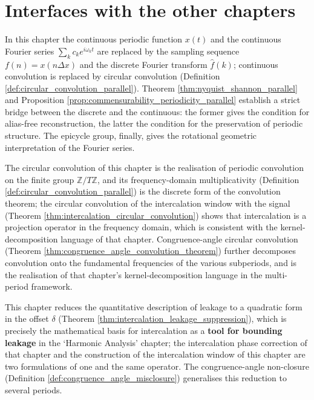 \section{Interfaces with the other chapters}\label{sec:ch17_interfaces}

\begin{remark}\label{rem:interface_periodic_function_parallel}
In this chapter the continuous periodic function $x(t)$ and the continuous Fourier series $\sum_kc_ke^{i\omega_kt}$ are replaced by the sampling sequence $f(n)=x(n\Delta x)$ and the discrete Fourier transform $\hat f(k)$; continuous convolution is replaced by circular convolution (Definition \ref{def:circular_convolution_parallel}). Theorem \ref{thm:nyquist_shannon_parallel} and Proposition \ref{prop:commensurability_periodicity_parallel} establish a strict bridge between the discrete and the continuous: the former gives the condition for alias-free reconstruction, the latter the condition for the preservation of periodic structure. The epicycle group, finally, gives the rotational geometric interpretation of the Fourier series.
\end{remark}

\begin{remark}\label{rem:interface_series_convolution_parallel}
The circular convolution of this chapter is the realisation of periodic convolution on the finite group $\mathbb{Z}/T\mathbb{Z}$, and its frequency-domain multiplicativity (Definition \ref{def:circular_convolution_parallel}) is the discrete form of the convolution theorem; the circular convolution of the intercalation window with the signal (Theorem \ref{thm:intercalation_circular_convolution}) shows that intercalation is a projection operator in the frequency domain, which is consistent with the kernel-decomposition language of that chapter. Congruence-angle circular convolution (Theorem \ref{thm:congruence_angle_convolution_theorem}) further decomposes convolution onto the fundamental frequencies of the various subperiods, and is the realisation of that chapter's kernel-decomposition language in the multi-period framework.
\end{remark}

\begin{remark}\label{rem:interface_harmonic_analysis_parallel}
This chapter reduces the quantitative description of leakage to a quadratic form in the offset $\delta$ (Theorem \ref{thm:intercalation_leakage_suppression}), which is precisely the mathematical basis for intercalation as a \textbf{tool for bounding leakage} in the `Harmonic Analysis' chapter; the intercalation phase correction of that chapter and the construction of the intercalation window of this chapter are two formulations of one and the same operator. The congruence-angle non-closure (Definition \ref{def:congruence_angle_misclosure}) generalises this reduction to several periods.
\end{remark}

